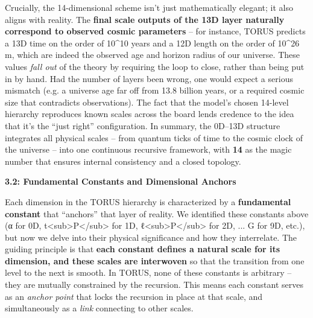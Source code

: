 \documentclass[
]{article}
\begin{document}
Crucially, the 14-dimensional scheme isn't just mathematically elegant;
it also aligns with reality. The \textbf{final scale outputs of the 13D
layer naturally correspond to observed cosmic parameters} -- for
instance, TORUS predicts a 13D time on the order of 10\^{}10 years and a
12D length on the order of 10\^{}26 m, which are indeed the observed age
and horizon radius of our universe\hspace{0pt}. These values \emph{fall
out} of the theory by requiring the loop to close, rather than being put
in by hand. Had the number of layers been wrong, one would expect a
serious mismatch (e.g. a universe age far off from 13.8 billion years,
or a required cosmic size that contradicts observations). The fact that
the model's chosen 14-level hierarchy reproduces known scales across the
board lends credence to the idea that it's the ``just right''
configuration. In summary, the 0D--13D structure integrates all physical
scales -- from quantum ticks of time to the cosmic clock of the universe
-- into one continuous recursive framework, with \textbf{14} as the
magic number that ensures internal consistency and a closed
topology\hspace{0pt}.

\textbf{3.2: Fundamental Constants and Dimensional Anchors}

Each dimension in the TORUS hierarchy is characterized by a
\textbf{fundamental constant} that ``anchors'' that layer of reality. We
identified these constants above (α for 0D,
t\textless sub\textgreater P\textless/sub\textgreater{} for 1D,
ℓ\textless sub\textgreater P\textless/sub\textgreater{} for 2D, ... G
for 9D, etc.), but now we delve into their physical significance and how
they interrelate. The guiding principle is that \textbf{each constant
defines a natural scale for its dimension, and these scales are
interwoven} so that the transition from one level to the next is smooth.
In TORUS, none of these constants is arbitrary -- they are mutually
constrained by the recursion. This means each constant serves as an
\emph{anchor point} that locks the recursion in place at that scale, and
simultaneously as a \emph{link} connecting to other scales.
\end{document}
